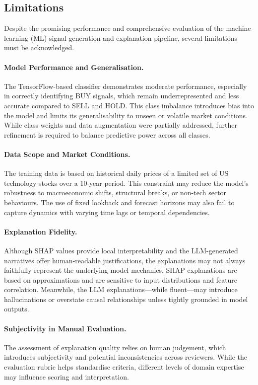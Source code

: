 \subsection{Limitations}

Despite the promising performance and comprehensive evaluation of the machine learning (ML) signal generation and explanation pipeline, several limitations must be acknowledged.

\paragraph{Model Performance and Generalisation.}  
The TensorFlow-based classifier demonstrates moderate performance, especially in correctly identifying BUY signals, which remain underrepresented and less accurate compared to SELL and HOLD. This class imbalance introduces bias into the model and limits its generalisability to unseen or volatile market conditions. While class weights and data augmentation were partially addressed, further refinement is required to balance predictive power across all classes.

\paragraph{Data Scope and Market Conditions.}  
The training data is based on historical daily prices of a limited set of US technology stocks over a 10-year period. This constraint may reduce the model’s robustness to macroeconomic shifts, structural breaks, or non-tech sector behaviours. The use of fixed lookback and forecast horizons may also fail to capture dynamics with varying time lags or temporal dependencies.

\paragraph{Explanation Fidelity.}  
Although SHAP values provide local interpretability and the LLM-generated narratives offer human-readable justifications, the explanations may not always faithfully represent the underlying model mechanics. SHAP explanations are based on approximations and are sensitive to input distributions and feature correlation. Meanwhile, the LLM explanations—while fluent—may introduce hallucinations or overstate causal relationships unless tightly grounded in model outputs.

\paragraph{Subjectivity in Manual Evaluation.}  
The assessment of explanation quality relies on human judgement, which introduces subjectivity and potential inconsistencies across reviewers. While the evaluation rubric helps standardise criteria, different levels of domain expertise may influence scoring and interpretation.

